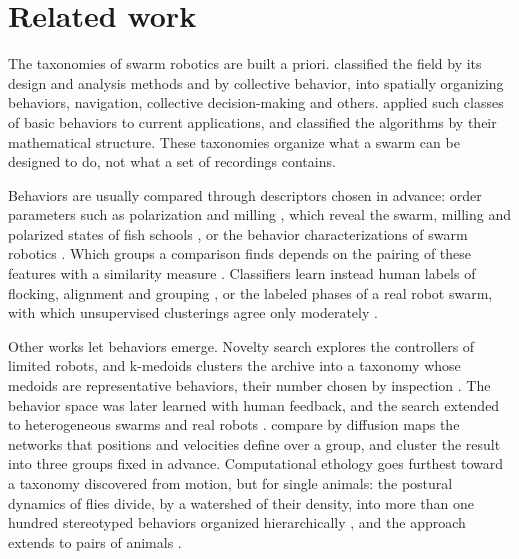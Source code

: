 \section{Related work}
\label{sec:related}

The taxonomies of swarm robotics are built a priori. \citet{brambilla2013swarm} classified the field by its design and
analysis methods and by collective behavior, into spatially organizing behaviors, navigation, collective
decision-making and others. \citet{schranz2020swarm} applied such classes of basic behaviors to current applications,
and \citet{rossi2018review} classified the algorithms by their mathematical structure. These taxonomies organize what a
swarm can be designed to do, not what a set of recordings contains.

Behaviors are usually compared through descriptors chosen in advance: order parameters such as polarization and
milling \citep{vicsek1995novel,couzin2002collective,dorsogna2006self}, which reveal the swarm, milling and polarized
states of fish schools \citep{tunstrom2013collective}, or the behavior characterizations of swarm robotics
\citep{gomes2013generic,gomes2014systematic}. Which groups a comparison finds depends on the pairing of these features
with a similarity measure \citep{fialho2026differ}. Classifiers learn instead human labels of flocking, alignment and
grouping \citep{abpeikar2023motion}, or the labeled phases of a real robot swarm, with which unsupervised clusterings
agree only moderately \citep{alhubaishi2026interpretable}.

Other works let behaviors emerge. Novelty search explores the controllers of limited robots, and k-medoids clusters
the archive into a taxonomy whose medoids are representative behaviors, their number chosen by inspection
\citep{brown2018discovery}. The behavior space was later learned with human feedback, and the search
extended to heterogeneous swarms and real robots \citep{mattson2023leveraging,mattson2023exploring,mattson2025discovery}.
\citet{titus2021unsupervised} compare by diffusion maps the networks that positions and velocities define over a group,
and cluster the result into three groups fixed in advance. Computational ethology goes furthest toward a taxonomy
discovered from motion, but for single animals: the postural dynamics of flies divide, by a watershed of their density,
into more than one hundred stereotyped behaviors organized hierarchically \citep{berman2014mapping,berman2016predictability},
and the approach extends to pairs of animals \citep{klibaite2017unsupervised}.

